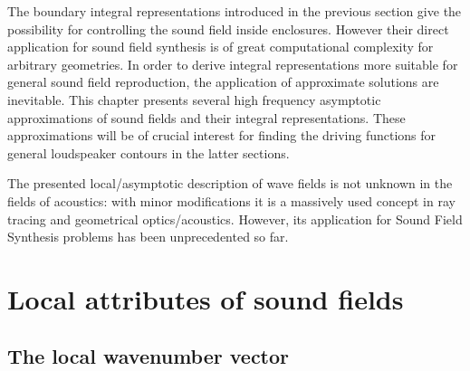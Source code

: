 The boundary integral representations introduced in the previous section give the possibility for controlling the sound field inside enclosures. 
However their direct application for sound field synthesis is of great computational complexity for arbitrary geometries.
In order to derive integral representations more suitable for general sound field reproduction, the application of approximate solutions are inevitable.
This chapter presents several high frequency asymptotic approximations of sound fields and their integral representations.
These approximations will be of crucial interest for finding the driving functions for general loudspeaker contours in the latter sections.

The presented local/asymptotic description of wave fields is not unknown in the fields of acoustics: with minor modifications it is a massively used concept in ray tracing and geometrical optics/acoustics.
However, its application for Sound Field Synthesis problems has been unprecedented so far.

\section{Local attributes of sound fields}
\subsection{The local wavenumber vector}

